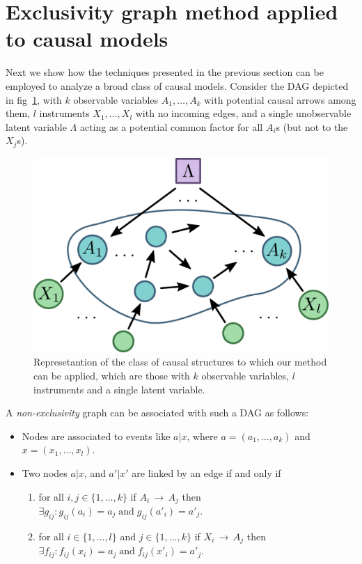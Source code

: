 \documentclass[letterpaper]{article}
\newcommand{\et}{\;\mathrm{and}\;}
\begin{document}
\section{Exclusivity graph method applied to causal models}
Next we show how the techniques presented in the previous section can be employed to analyze
a broad class of causal models. Consider the DAG depicted in fig~\ref{fig:onelambda}, with
$k$ observable variables $A_1, \ldots, A_k$ with potential causal arrows among them, $l$
instruments $X_1, \ldots, X_l$ with no incoming edges, and a single unobservable latent
variable $\Lambda$ acting as a potential common factor for all $A_i$s (but not to
the $X_j$s).

\begin{figure}[h]
    \centering
    \includegraphics[width=.9\columnwidth]{images/onelambda.pdf}
    \caption{Represetantion of the class of causal structures to which our
        method can be applied, which are those with $k$ observable variables, $l$
        instruments and a single latent variable.}
    \label{fig:onelambda}
\end{figure}

A \emph{non-exclusivity} graph can be associated with such a DAG
as follows:
\begin{itemize}
    \item Nodes are associated to events like $a | x$, where $a = (a_1,\ldots,a_k)$ and  $x = (x_1,\ldots,x_l)$.
    \item Two nodes $a | x $, and $a' | x'$ are linked by an edge if and only if 
        \begin{enumerate}
            \item for all $i,j \in \{1 ,\ldots,k\}$ if $A_i\,
                \rightarrow\, A_j$ then $\exists g_{ij} : g_{ij}(a_i) = a_j
                \et g_{ij}(a'_i) = a'_j$.
            \item for all $i\in \{1,\ldots,l\}$ and $j\in \{1,\ldots,k\}$ if
                $X_i\,\rightarrow\,A_j$ then $\exists f_{ij} : f_{ij}(x_i) = a_j
                \et f_{ij}(x'_i) = a'_j$.
        \end{enumerate}
\end{itemize}
\end{document}
